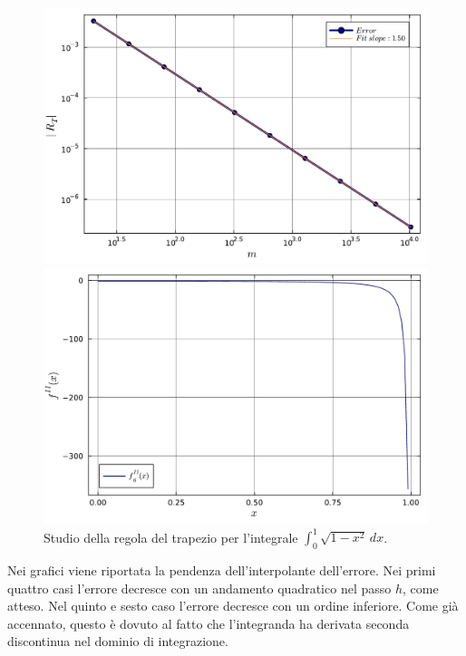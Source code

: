 \documentclass[letterpaper, 12pt]{article}
\numberwithin{equation}{section}    %
\begin{document}
\begin{figure}[!ht]
    \centering
    \begin{minipage}[b]{0.47\textwidth}
        \includegraphics[width=\textwidth]{5126.pdf}
    \end{minipage}
    \hspace{0.5cm}
    \begin{minipage}[b]{0.47\textwidth}
        \includegraphics[width=\textwidth]{5126_2.pdf}
    \end{minipage}
    \caption{Studio della regola del trapezio per l'integrale $\int_0^1 \sqrt{1-x^2}\, dx$.}
    \label{fig:es5_1_2_6}
\end{figure}

Nei grafici viene riportata la pendenza dell'interpolante dell'errore. Nei primi quattro casi l'errore 
decresce con un andamento quadratico nel passo $h$, come atteso. Nel quinto e sesto caso l'errore decresce 
con un ordine inferiore. Come già accennato, questo è dovuto al fatto che l'integranda ha derivata seconda 
discontinua nel dominio di integrazione.
\end{document}
